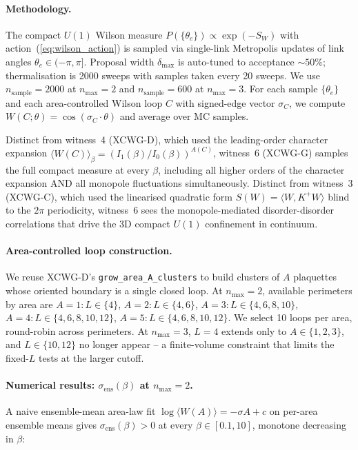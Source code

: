 \documentclass[11pt]{article}
\begin{document}
\paragraph{Methodology.} The compact $U(1)$ Wilson measure
$P(\{\theta_e\})\propto\exp(-S_W)$ with action~(\ref{eq:wilson_action}) is
sampled via single-link Metropolis updates of link angles
$\theta_e\in(-\pi,\pi]$. Proposal width $\delta_\text{max}$ is auto-tuned to
acceptance $\sim 50\%$; thermalisation is 2000 sweeps with samples taken
every 20 sweeps. We use $n_\text{sample}=2000$ at $n_\text{max}=2$ and
$n_\text{sample}=600$ at $n_\text{max}=3$. For each sample $\{\theta_e\}$ and
each area-controlled Wilson loop $C$ with signed-edge vector $\sigma_C$, we
compute $W(C;\theta)=\cos(\sigma_C\cdot\theta)$ and average over MC samples.

Distinct from witness~4 (XCWG-D), which used the leading-order character
expansion $\langle W(C)\rangle_\beta=(I_1(\beta)/I_0(\beta))^{A(C)}$,
witness~6 (XCWG-G) samples the full compact measure at every $\beta$,
including all higher orders of the character expansion AND all monopole
fluctuations simultaneously. Distinct from witness~3 (XCWG-C), which used the
linearised quadratic form $S(W)=\langle W,K^+W\rangle$ blind to the $2\pi$
periodicity, witness~6 sees the monopole-mediated disorder-disorder
correlations that drive the 3D compact $U(1)$ confinement in continuum.

\paragraph{Area-controlled loop construction.} We reuse XCWG-D's
\verb|grow_area_A_clusters| to build clusters of $A$ plaquettes whose oriented
boundary is a single closed loop. At $n_\text{max}=2$, available perimeters
by area are $A=1:L\in\{4\}$, $A=2:L\in\{4,6\}$, $A=3:L\in\{4,6,8,10\}$,
$A=4:L\in\{4,6,8,10,12\}$, $A=5:L\in\{4,6,8,10,12\}$. We select 10 loops per
area, round-robin across perimeters. At $n_\text{max}=3$, $L=4$ extends only
to $A\in\{1,2,3\}$, and $L\in\{10,12\}$ no longer appear -- a finite-volume
constraint that limits the fixed-$L$ tests at the larger cutoff.

\paragraph{Numerical results: $\sigma_\text{ens}(\beta)$ at $n_\text{max}=2$.}
A naive ensemble-mean area-law fit
$\log\langle W(A)\rangle=-\sigma A+c$ on per-area ensemble means gives
$\sigma_\text{ens}(\beta)>0$ at every $\beta\in[0.1,10]$, monotone decreasing
in $\beta$:
\end{document}
